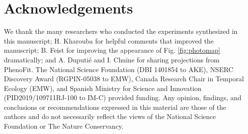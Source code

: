 \documentclass{article}
\begin{document}
\section*{Acknowledgements}
We thank the many researchers who conducted the experiments synthesized in this manuscript; H. Kharouba for helpful comments that improved the manuscript; B. Feist for improving the appearance of Fig. \ref{fig:photomap} dramatically; and A. Duputi\'e and I. Chuine for sharing projections from PhenoFit. The National Science Foundation (DBI 1401854 to AKE), NSERC Discovery Award (RGPIN-05038 to EMW), Canada Research Chair in Temporal Ecology (EMW), and Spanish Ministry for Science and Innovation (PID2019/109711RJ-100 to IM-C) provided funding. Any opinion, findings, and conclusions or recommendations expressed in this material are those of the authors and do not necessarily reflect the views of the National Science Foundation or The Nature Conservancy.
\end{document}
